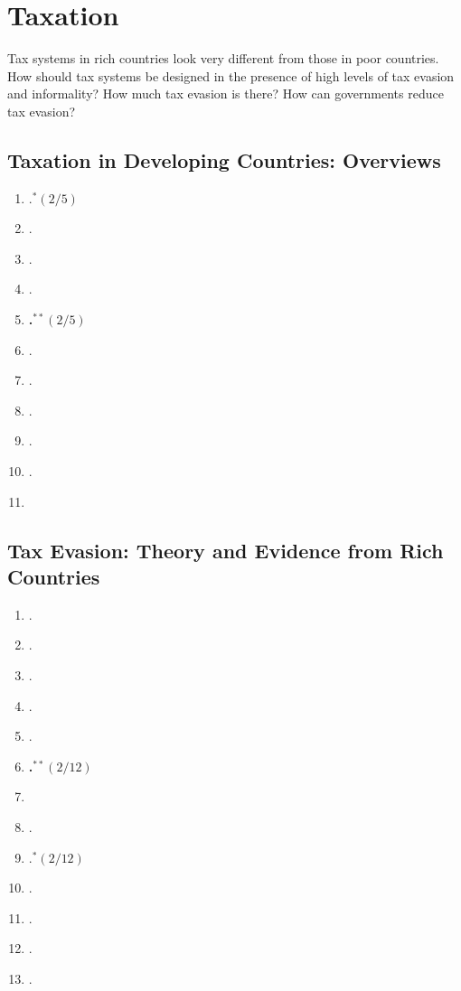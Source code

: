 \documentclass[11pt]{article}
\begin{document}
\section{Taxation}
Tax systems in rich countries look very different from those in poor countries. How should tax systems be designed in the presence of high levels of tax evasion and informality? How much tax evasion is there? How can governments reduce tax evasion?

\subsection{Taxation in Developing Countries: Overviews}

\begin{enumerate}
\item {}.$^{*}(2/5)$
\item {}.
\item {}.
\item {}.
\item \textbf{.$^{**}(2/5)$}
\item {}.
\item {}.
\item {}.
\item {}.
\item {}.
\item {}
\end{enumerate}

\subsection{Tax Evasion: Theory and Evidence from Rich Countries}

\begin{enumerate}
\item {}.
\item {}.
\item {}.
\item {}.
\item {}.
\item \textbf{.$^{**}(2/12)$}
\item {}
\item {}.
\item {}.$^{*}(2/12)$
\item {}.
\item {}.
\item {}.
\item {}.
\end{enumerate}
\end{document}
